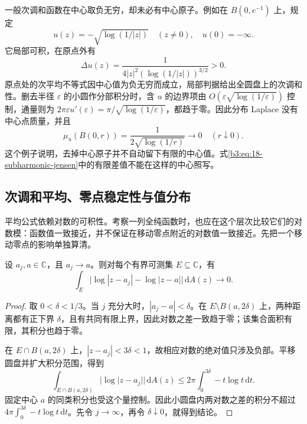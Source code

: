 一般次调和函数在中心取负无穷，却未必有中心原子。例如在 \(B(0,e^{-1})\) 上，规定
\[
 u(z)=-\sqrt{\log(1/|z|)}\quad(z\ne0),
 \quad u(0)=-\infty.
\]
它局部可积，在原点外有
\[
 \Delta u(z)=\frac1{4|z|^2(\log(1/|z|))^{3/2}}>0.
\]
原点处的次平均不等式因中心值为负无穷而成立，局部判据给出全圆盘上的次调和性。删去半径 \(\varepsilon\) 的小圆作分部积分时，含 \(u\) 的边界项由 \(O(\varepsilon\sqrt{\log(1/\varepsilon)})\) 控制，通量则为 \(2\pi\varepsilon u'(\varepsilon)=\pi/\sqrt{\log(1/\varepsilon)}\)，都趋于零。因此分布 Laplace 没有中心点质量，并且
\[
 \mu_u(B(0,r))=\frac1{2\sqrt{\log(1/r)}}\longrightarrow0
 \quad(r\downarrow0).
\]
这个例子说明，去掉中心原子并不自动留下有限的中心值。式\eqref{b3:eq:18-subharmonic-jensen}中的有限差值不能在这样的中心照写。

\subsection{次调和平均、零点稳定性与值分布}
\label{b3:subsec:180304}

平均公式依赖对数的可积性。考察一列全纯函数时，也应在这个层次比较它们的对数模：函数值一致接近，并不保证在移动零点附近的对数值一致接近。先把一个移动零点的影响单独算清。

\begin{lemma}[移动对数核的局部可积收敛]\label{b3:lem:18-moving-log}
设 \(a_j,a\in\mathbb C\)，且 \(a_j\to a\)。则对每个有界可测集 \(E\subseteq\mathbb C\)，有
\[
 \int_E\bigl|\log|z-a_j|-\log|z-a|\bigr|\,\mathrm dA(z)\longrightarrow0.
\]
\end{lemma}
\begin{proof}
取 \(0<\delta<1/3\)。当 \(j\) 充分大时，\(|a_j-a|<\delta\)。在 \(E\setminus B(a,2\delta)\) 上，两种距离都有正下界 \(\delta\)，且有共同有限上界，因此对数之差一致趋于零；该集合面积有限，其积分也趋于零。

在 \(E\cap B(a,2\delta)\) 上，\(|z-a_j|<3\delta<1\)，故相应对数的绝对值只涉及负部。平移圆盘并扩大积分范围，得到
\[
 \int_{E\cap B(a,2\delta)}|\log|z-a_j||\,\mathrm dA(z)
 \le2\pi\int_0^{3\delta}-t\log t\,\mathrm dt.
\]
固定中心 \(a\) 的同类积分也受这个量控制。因此小圆盘内两对数之差的积分不超过 \(4\pi\int_0^{3\delta}-t\log t\,\mathrm dt\)。先令 \(j\to\infty\)，再令 \(\delta\downarrow0\)，就得到结论。
\end{proof}

